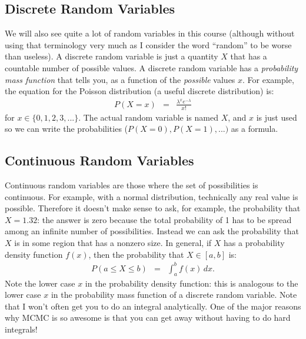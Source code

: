 \subsection{Discrete Random Variables}
We will also see quite a lot of random variables in this course (although
without using that terminology very much as I consider the word ``random'' to be
worse than useless). A discrete
random variable is just a quantity $X$ that has a countable number of possible
values. A discrete random variable has a {\it probability mass function}
that tells you, as a function of the {\it possible} values $x$.
For example, the equation for the Poisson distribution (a useful discrete
distribution) is:
\begin{eqnarray}
P(X=x) &=& \frac{\lambda^x e^{-\lambda}}{x!}
\end{eqnarray}
for $x \in \{0, 1, 2, 3, ...\}$. The actual random variable is named $X$, and
$x$ is just used so we can write the probabilities ($P(X=0), P(X=1), ...)$ as
a formula.

\subsection{Continuous Random Variables}
Continuous random variables are those where the set of possibilities is
continuous. For example, with a normal distribution, technically any real value
is possible. Therefore it doesn't make sense to ask, for example, the probability
that $X=1.32$: the answer is zero because the total probability of 1 has to be
spread among an infinite number of possibilities. Instead we can ask the probability
that $X$ is in some region that has a nonzero size. In general, if $X$ has a
probability density function $f(x)$, then the probability that $X \in [a, b]$ is:
\begin{eqnarray}
P(a \leq X \leq b) &=& \int_a^b f(x) \, dx.
\end{eqnarray}
Note the lower case $x$ in the probability density function: this is analogous
to the lower case $x$ in the probability mass function of a discrete random
variable. Note that I won't often get you to do an integral analytically. One
of the major reasons why MCMC is so awesome is that you can get away without
having to do hard integrals!

